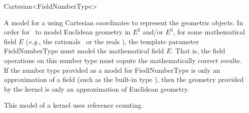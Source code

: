 \begin{ccRefClass}{Cartesian<FieldNumberType>}

\ccDefinition
A model for a  using Cartesian coordinates to represent the
geometric objects.  In order for \ccRefName\ to model Euclidean geometry
in $E^2$ and/or $E^3$, for some mathematical field $E$ (\textit{e.g.},
the rationals \Q\ or the reals \R), the template parameter FieldNumberType 
must model the mathematical field $E$.  That is, the field operations on this
number type must copute the mathematically correct results.  If the number 
type provided as a model for FiedlNumberType is only an approximation of a 
field (such as the built-in type ), then the geometry provided by 
the kernel is only an approximation of Euclidean geometry.  

\ccIsModel
{}

\ccTypes
{}
\ccGlue
{}

\ccImplementation
This model of a kernel uses reference counting.

\ccSeeAlso
{}  \\
 \\
 \\

\end{ccRefClass}
